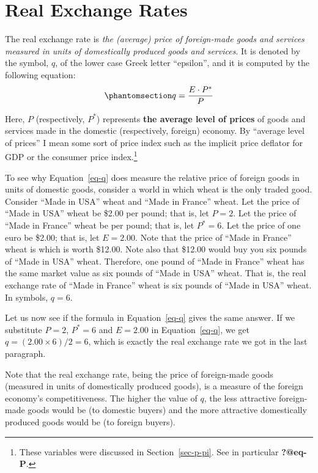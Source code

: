 \documentclass[
  letterpaper,
]{book}
\begin{document}
\section{Real Exchange Rates}\label{sec-realexrates}

The real exchange rate is
\emph{the (average) price of foreign-made goods and services measured in
units of domestically produced goods and services}. It is denoted by the
symbol, \(q\), of the lower case Greek letter ``epsilon'', and it is
computed by the following equation:
\begin{equation}\phantomsection\label{eq-q}{
q=\frac{E\cdot P^*}{P}
}\end{equation}

Here, \(P\) (respectively, \(P^*\)) represents \textbf{the average level
of prices} of goods and services made in the domestic (respectively,
foreign) economy. By ``average level of prices'' I mean some sort of
price index such as the implicit price deflator for GDP or the consumer
price index.\footnote{These variables were
  discussed in Section~\ref{sec-p-pi}. See in particular
  \textbf{?@eq-P}.}

To see why Equation~\ref{eq-q} does measure the relative price of
foreign goods in units of domestic goods, consider a world in which
wheat is the only traded good. Consider ``Made in USA'' wheat and ``Made
in France'' wheat. Let the price of ``Made in USA'' wheat be \$2.00 per
pound; that is, let \(P=2\). Let the price of ``Made in France'' wheat
be  per pound; that is, let \(P^*=6\). Let the price of one
euro be \$2.00; that is, let \(E=2.00\). Note that the price of ``Made
in France'' wheat is  which is worth \$12.00. Note also that
\$12.00 would buy you six pounds of ``Made in USA'' wheat. Therefore,
one pound of ``Made in France'' wheat has the same market value as six
pounds of ``Made in USA'' wheat. That is, the real exchange rate of
``Made in France'' wheat is six pounds of ``Made in USA'' wheat. In
symbols, \(q=6\).

Let us now see if the formula in Equation~\ref{eq-q} gives the same
answer. If we substitute \(P=2\), \(P^*=6\) and \(E=2.00\) in
Equation~\ref{eq-q}, we get \(q=(2.00\times 6)/2 =6\), which is exactly
the real exchange rate we got in the last paragraph.

Note that the real exchange rate, being the price of foreign-made goods
(measured in units of domestically produced goods), is a measure of the
foreign economy's
competitiveness.
The higher the value of \(q\), the less attractive foreign-made goods
would be (to domestic buyers) and the more attractive domestically
produced goods would be (to foreign buyers).
\end{document}

